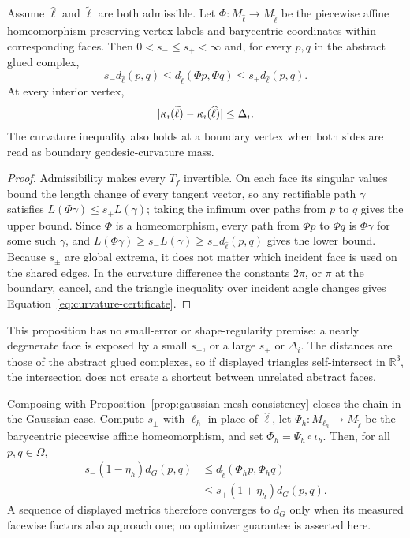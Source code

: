 \begin{proposition}
\label{prop:pl-certificate}
Assume $\widehat\ell$ and $\widetilde\ell$ are both admissible.  Let
$\Phi:M_{\widehat\ell}\to M_{\widetilde\ell}$ be the piecewise affine
homeomorphism preserving vertex labels and barycentric coordinates within
corresponding faces.  Then $0<s_-\le s_+<\infty$ and, for every $p,q$ in the
abstract glued complex,
\begin{equation}
 s_-d_{\widehat\ell}(p,q)
 \le d_{\widetilde\ell}(\Phi p,\Phi q)
 \le s_+d_{\widehat\ell}(p,q).
 \label{eq:distance-certificate}
\end{equation}
At every interior vertex,
\begin{equation}
 \lvert \kappa_i(\widetilde\ell)-\kappa_i(\widehat\ell)\rvert
 \le \Delta_i.
 \label{eq:curvature-certificate}
\end{equation}
The curvature inequality also holds at a boundary vertex when both sides are
read as boundary geodesic-curvature mass.
\end{proposition}

\begin{proof}
Admissibility makes every $T_f$ invertible.  On each face its singular values
bound the length change of every tangent vector, so any rectifiable path
$\gamma$ satisfies $L(\Phi\gamma)\le s_+L(\gamma)$; taking the infimum over
paths from $p$ to $q$ gives the upper bound.  Since $\Phi$ is a homeomorphism,
every path from $\Phi p$ to $\Phi q$ is $\Phi\gamma$ for some such $\gamma$,
and $L(\Phi\gamma)\ge s_-L(\gamma)\ge s_-d_{\widehat\ell}(p,q)$ gives the
lower bound.  Because $s_\pm$ are global extrema, it does not matter which
incident face is used on the shared edges.  In the curvature difference the
constants $2\pi$, or $\pi$ at the boundary, cancel, and the triangle
inequality over incident angle changes gives
Equation~\eqref{eq:curvature-certificate}.
\end{proof}

This proposition has no small-error or shape-regularity premise: a nearly
degenerate face is exposed by a small $s_-$, or a large $s_+$ or $\Delta_i$.
The distances are those of the abstract glued complexes, so if displayed
triangles self-intersect in $\mathbb R^3$, the intersection does not create a
shortcut between unrelated abstract faces.

Composing with Proposition~\ref{prop:gaussian-mesh-consistency} closes the
chain in the Gaussian case.  Compute $s_\pm$ with $\ell_h$ in place of
$\widehat\ell$, let $\Psi_h:M_{\ell_h}\to M_{\widetilde\ell}$ be the
barycentric piecewise affine homeomorphism, and set
$\Phi_h=\Psi_h\circ\iota_h$.  Then, for all $p,q\in\Omega$,
\begin{equation}
 \begin{aligned}
 s_-(1-\eta_h)d_G(p,q)
 &\le d_{\widetilde\ell}(\Phi_hp,\Phi_hq)\\
 &\le s_+(1+\eta_h)d_G(p,q).
 \end{aligned}
 \label{eq:end-to-end-gaussian-display}
\end{equation}
A sequence of displayed metrics therefore converges to $d_G$ only when its
measured facewise factors also approach one; no optimizer guarantee is
asserted here.

